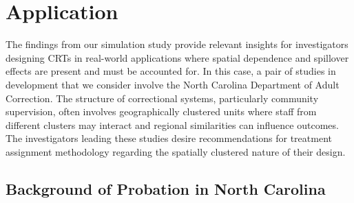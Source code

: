 \documentclass{article}[11pt]
\begin{document}




\section{Application}

The findings from our simulation study provide relevant insights for investigators designing CRTs in real-world applications where spatial dependence and spillover effects are present and must be accounted for. In this case, a pair of studies in development that we consider involve the North Carolina Department of Adult Correction. The structure of correctional systems, particularly community supervision, often involves geographically clustered units where staff from different clusters may interact and regional similarities can influence outcomes. The investigators leading these studies desire recommendations for treatment assignment methodology regarding the spatially clustered nature of their design.

\subsection{Background of Probation in North Carolina}
\end{document}
